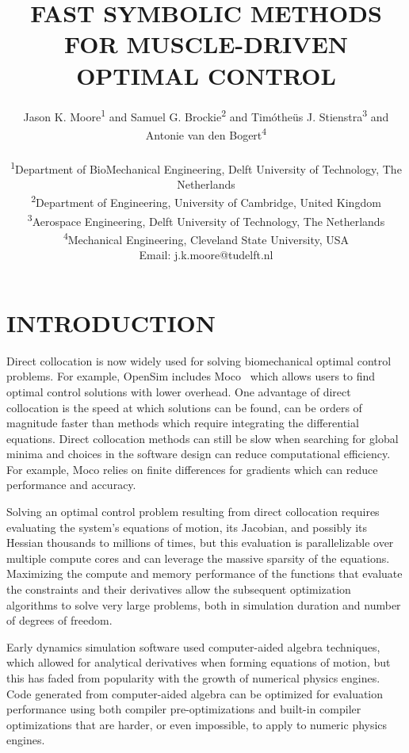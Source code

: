 \documentclass[11pt,twocolumn]{article}
\title{\normalsize\textbf{
  FAST SYMBOLIC METHODS FOR MUSCLE-DRIVEN OPTIMAL CONTROL
}}
\author{
Jason K. Moore\textsuperscript{1} and
Samuel G. Brockie\textsuperscript{2} and
Timótheüs J. Stienstra\textsuperscript{3} and
Antonie van den Bogert\textsuperscript{4}\\ \\
\textsuperscript{1}Department of BioMechanical Engineering, Delft University of Technology, The Netherlands\\
\textsuperscript{2}Department of Engineering, University of Cambridge, United Kingdom\\
\textsuperscript{3}Aerospace Engineering, Delft University of Technology, The Netherlands\\
\textsuperscript{4}Mechanical Engineering, Cleveland State University, USA\\
Email: j.k.moore@tudelft.nl}
\date{}
\begin{document}
\pagestyle{fancy}
\lhead{}
\fancyfoot{}
\maketitle
\section*{INTRODUCTION}
%
Direct collocation is now widely used for solving biomechanical optimal control
problems. For example, OpenSim includes Moco~\cite{Dembia2019} which allows
users to find optimal control solutions with lower overhead. One advantage of
direct collocation is the speed at which solutions can be found, can be orders
of magnitude faster than methods which require integrating the differential
equations. Direct collocation methods can still be slow when searching for
global minima and choices in the software design can reduce computational
efficiency. For example, Moco relies on finite differences for gradients which
can reduce performance and accuracy.

Solving an optimal control problem resulting from direct collocation requires
evaluating the system's equations of motion, its Jacobian, and possibly its
Hessian thousands to millions of times, but this evaluation is parallelizable
over multiple compute cores and can leverage the massive sparsity of the
equations. Maximizing the compute and memory performance of the functions that
evaluate the constraints and their derivatives allow the subsequent optimization
algorithms to solve very large problems, both in simulation duration and number
of degrees of freedom.

Early dynamics simulation software used computer-aided algebra techniques, which
allowed for analytical derivatives when forming equations of motion, but this
has faded from popularity with the growth of numerical physics engines. Code
generated from computer-aided algebra can be optimized for evaluation
performance using both compiler pre-optimizations and built-in compiler
optimizations that are harder, or even impossible, to apply to numeric physics
engines.
\end{document}
